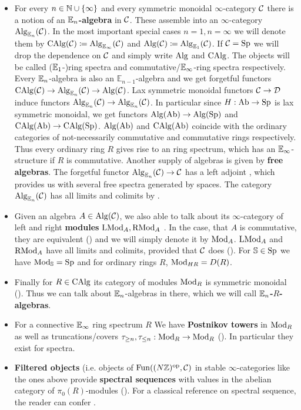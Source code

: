 \begin{itemize}
    \item For every $n\in\mathbb{N}\cup\{\infty\}$ and every symmetric monoidal $\infty$-category $\mathcal{C}$ there is a notion of an \textbf{$\mathbb{E}_n$-algebra} in $\mathcal{C}$. 
    These assemble into an $\infty$-category $\operatorname{Alg}_{\mathbb{E}_n}(\mathcal{C})$. 
    In the most important special cases $n=1,n=\infty$ we will denote them by $\operatorname{CAlg}(\mathcal{C})\coloneqq \operatorname{Alg}_{\mathbb{E}_\infty}(\mathcal{C})$ and $\operatorname{Alg}(\mathcal{C})\coloneqq \operatorname{Alg}_{\mathbb{E}_1}(\mathcal{C})$. If $\mathcal{C}=\operatorname{Sp}$ we will drop the dependence on $\mathcal{C}$ and simply write $\operatorname{Alg}$ and $\operatorname{CAlg}$. The objects will be called ($\mathbb{E}_1$-)ring spectra and commutative/$\mathbb{E}_\infty$-ring spectra respectively.
    Every $\mathbb{E}_n$-algebra is also an $\mathbb{E}_{n-1}$-algebra and we get forgetful functors $\operatorname{CAlg}(\mathcal{C})\rightarrow \operatorname{Alg}_{\mathbb{E}_n}(\mathcal{C})\rightarrow \operatorname{Alg}(\mathcal{C})$. 
    Lax symmetric monoidal functors $\mathcal{C}\rightarrow\mathcal{D}$ induce functors $\operatorname{Alg}_{\mathbb{E}_n}(\mathcal{C})\rightarrow \operatorname{Alg}_{\mathbb{E}_n}(\mathcal{C})$. In particular since $H:\operatorname{Ab}\rightarrow\operatorname{Sp}$ is lax symmetric monoidal, we get functors $\operatorname{Alg}(\operatorname{Ab})\rightarrow \operatorname{Alg}(\operatorname{Sp})$ and  $\operatorname{CAlg}(\operatorname{Ab})\rightarrow \operatorname{CAlg}(\operatorname{Sp})$. $\operatorname{Alg}(\operatorname{Ab})$ and $\operatorname{CAlg}(\operatorname{Ab})$ coincide with the ordinary categories of not-necessarily commutative and commutative rings respectively. Thus every ordinary ring $R$ gives rise to an ring spectrum, which has an $\mathbb{E}_\infty$-structure if $R$ is commutative. Another supply of algebras is given by \textbf{free algebras}. The forgetful functor $\operatorname{Alg}_{\mathbb{E}_n}(\mathcal{C})\to \mathcal{C}$ has a left adjoint \cite[Section~3.1]{lurie2017higher}, which provides us with several free spectra generated by spaces. The category $\operatorname{Alg}_{\mathbb{E}_n}(\mathcal{C})$ has all limits and colimits by \cite[Section~3.2]{lurie2017higher}.

    \item Given an algebra $A\in \operatorname{Alg}(\mathcal{C})$, we also able to talk about its $\infty$-category of left and right \textbf{modules }$\operatorname{LMod}_A, \operatorname{RMod}_A$ \cite[Definition~4.2.1.13]{lurie2017higher}. In the case, that $A$ is commutative, they are equivalent (\cite[Section~4.3.2]{lurie2017higher}) and we will simply denote it by $\operatorname{Mod}_A$. $\operatorname{LMod}_A$ and $\operatorname{RMod}_A$ have all limits and colimits, provided that $\mathcal{C}$ does (\cite[Section~4.2.3]{lurie2017higher}). For $\mathbb{S}\in\operatorname{Sp}$ we have $\operatorname{Mod}_{\mathbb{S}}=\operatorname{Sp}$ and for ordinary rings $R$, $\operatorname{Mod}_{HR}=D(R)$.
    \item Finally for $R\in \operatorname{CAlg}$ its category of modules $\operatorname{Mod}_R$ is symmetric monoidal (\cite[Theorem~4.5.2.1]{lurie2017higher}). Thus we can talk about $\mathbb{E}_n$-algebras in there, which we will call \textbf{$\mathbb{E}_n$-$R$-algebras}. 
    \item For a connective $\mathbb{E}_\infty$ ring spectrum $R$ We have \textbf{Postnikov towers} in $\operatorname{Mod}_R$ as well as truncations/covers $\tau_{\geq n},\tau_{\leq n}:\operatorname{Mod}_R\to \operatorname{Mod}_R$ (\cite[Proposition~7.1.1.13]{lurie2017higher}). In particular they exist for spectra.
    \item \textbf{Filtered objects} (i.e. objects of $\operatorname{Fun}((N\mathbb{Z})^{\operatorname{op}},\mathcal{C})$ in stable $\infty$-categories like the ones above provide \textbf{spectral sequences} with values in the abelian category of $\pi_0(R)$-modules (\cite[Section~1.2.2]{lurie2017higher}). For a classical reference on spectral sequence, the reader can confer \cite[Chapter~5]{weibel1994introduction}.

\end{itemize}

